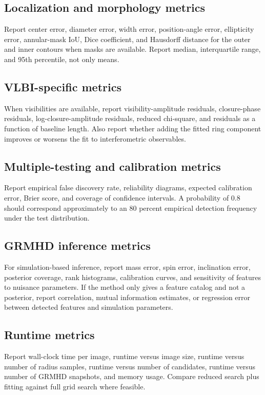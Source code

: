 \documentclass[11pt]{article}
\begin{document}
\subsection{Localization and morphology metrics}
Report center error, diameter error, width error, position-angle error, ellipticity error, annular-mask IoU, Dice coefficient, and Hausdorff distance for the outer and inner contours when masks are available. Report median, interquartile range, and 95th percentile, not only means.

\subsection{VLBI-specific metrics}
When visibilities are available, report visibility-amplitude residuals, closure-phase residuals, log-closure-amplitude residuals, reduced chi-square, and residuals as a function of baseline length. Also report whether adding the fitted ring component improves or worsens the fit to interferometric observables.

\subsection{Multiple-testing and calibration metrics}
Report empirical false discovery rate, reliability diagrams, expected calibration error, Brier score, and coverage of confidence intervals. A probability of 0.8 should correspond approximately to an 80 percent empirical detection frequency under the test distribution.

\subsection{GRMHD inference metrics}
For simulation-based inference, report mass error, spin error, inclination error, posterior coverage, rank histograms, calibration curves, and sensitivity of features to nuisance parameters. If the method only gives a feature catalog and not a posterior, report correlation, mutual information estimates, or regression error between detected features and simulation parameters.

\subsection{Runtime metrics}
Report wall-clock time per image, runtime versus image size, runtime versus number of radius samples, runtime versus number of candidates, runtime versus number of GRMHD snapshots, and memory usage. Compare reduced search plus fitting against full grid search where feasible.
\end{document}

